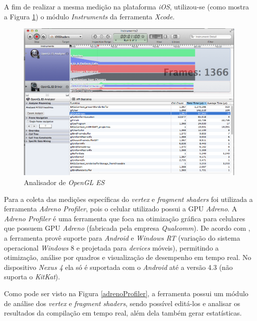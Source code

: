 	A fim de realizar a mesma medição na plataforma \textit{iOS}, utilizou-se (como mostra a Figura \ref{instruments}) o módulo \textit{Instruments} da ferramenta \textit{Xcode}.

	\begin{figure}[ht]
	\centering
		\includegraphics[keepaspectratio=true,scale=0.3]{figuras/analyzer_opengles.png}
	\caption{Analisador de \textit{OpenGL ES}}
	\label{instruments}
	\end{figure}


	Para a coleta das medições específicas do \textit{vertex} e \textit{fragment shaders} foi utilizada a ferramenta \textit{Adreno Profiler}, pois o celular utilizado possui a GPU \textit{Adreno}. A \textit{Adreno Profiler} é uma ferramenta que foca na otimização gráfica para celulares que possuem GPU \textit{Adreno} (fabricada pela empresa \textit{Qualcomm}). De acordo com  \cite{adp}, a ferramenta provê suporte para \textit{Android} e \textit{Windows RT} (variação do sistema operacional \textit{Windows} 8  e projetada para \textit{devices} móveis), permitindo a otimização, análise por quadros e visualização de desempenho em tempo real. No dispositivo \textit{Nexus 4} ela só é suportada com o \textit{Android} até a versão 4.3 (não suporta o \textit{KitKat}). 

	Como pode ser visto na Figura \ref{adrenoProfiler}, a ferramenta possui um módulo de análise dos \textit{vertex} e \textit{fragment} \textit{shaders}, sendo possível editá-los e analisar os resultados da compilação em tempo real, além dela também gerar estatísticas.  

